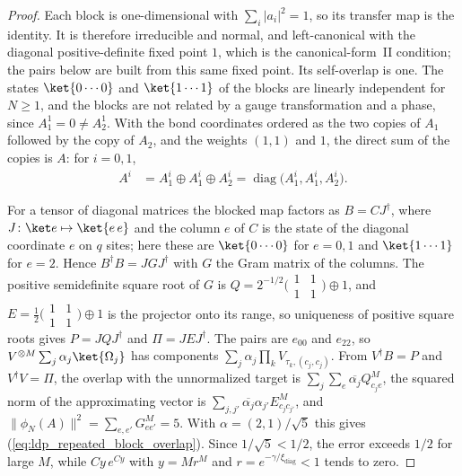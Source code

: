 \begin{proof}
    \leanok
    Each block is one-dimensional with $\sum_i\lvert a_i\rvert^2=1$, so its
    transfer map is the identity. It is therefore irreducible and normal, and
    left-canonical with the diagonal positive-definite fixed point $1$, which is
    the canonical-form~II condition; the pairs below are built from this same
    fixed point. Its self-overlap is one. The
    states $\ket{0\cdots0}$ and $\ket{1\cdots1}$ of the blocks are linearly
    independent for $N\geq1$, and the blocks are not related by a gauge
    transformation and a phase, since $A_1^1=0\neq A_2^1$. With the bond
    coordinates ordered as the two copies of $A_1$ followed by the copy of
    $A_2$, and the weights $(1,1)$ and $1$, the direct sum of the copies is $A$:
    for $i=0,1$,
    \begin{align}
        A^i & =A_1^i\oplus A_1^i\oplus A_2^i
        =\operatorname{diag}\bigl(A_1^i,A_1^i,A_2^i\bigr).
        \label{eq:ldp_repeated_block_assembly}
    \end{align}

    For a tensor of diagonal matrices the blocked map factors as $B=CJ^\dagger$,
    where $J\colon\ket e\mapsto\ket{e\,e}$ and the column $e$ of $C$ is the state
    of the diagonal coordinate $e$ on $q$ sites; here these are $\ket{0\cdots0}$
    for $e=0,1$ and $\ket{1\cdots1}$ for $e=2$. Hence $B^\dagger B=JGJ^\dagger$ with
    $G$ the Gram matrix of the columns. The positive semidefinite square root of $G$
    is $Q=2^{-1/2}\bigl(\begin{smallmatrix}1&1\\1&1\end{smallmatrix}\bigr)\oplus1$,
    and $E=\tfrac12\bigl(\begin{smallmatrix}1&1\\1&1\end{smallmatrix}\bigr)\oplus1$
    is the projector onto its range, so uniqueness of positive square roots gives
    $P=JQJ^\dagger$ and $\Pi=JEJ^\dagger$. The pairs are $e_{00}$ and $e_{22}$, so
    $V^{\otimes M}\sum_j\alpha_j\ket{\Omega_j}$ has components
    $\sum_j\alpha_j\prod_kV_{\tau_k,(c_j,c_j)}$. From $V^\dagger B=P$ and
    $V^\dagger V=\Pi$, the overlap with the unnormalized target is
    $\sum_j\sum_e\overline{\alpha_j}Q_{c_je}^M$, the squared norm of the
    approximating vector is $\sum_{j,j'}\overline{\alpha_j}\alpha_{j'}E_{c_jc_{j'}}^M$,
    and $\lVert\phi_N(A)\rVert^2=\sum_{e,e'}G_{ee'}^M=5$. With
    $\alpha=(2,1)/\sqrt5$ this gives (\ref{eq:ldp_repeated_block_overlap}). Since
    $1/\sqrt5<1/2$, the error exceeds $1/2$ for large $M$, while $Cy\,e^{Cy}$ with
    $y=Mr^M$ and $r=e^{-\gamma/\xi_{\mathrm{diag}}}<1$ tends to zero.
\end{proof}

